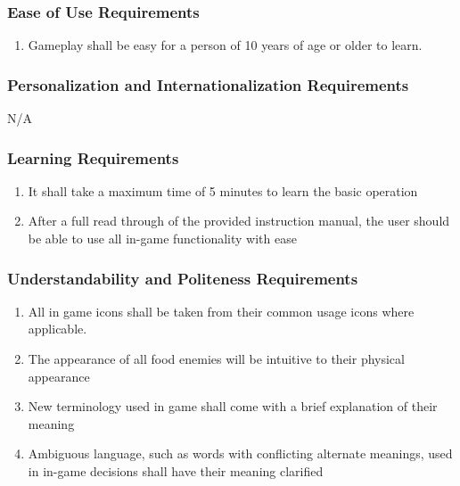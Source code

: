 \documentclass[12pt, titlepage]{article}
\begin{document}
\subsubsection{Ease of Use Requirements}
\label{ssub:ease_of_use_requirements}
\begin{enumerate}[start=1,label={ UH\arabic*.}]
        \item Gameplay shall be easy for a person of 10 years of age or older to learn.
\end{enumerate}

\subsubsection{Personalization and Internationalization Requirements}
\label{ssub:personalization_and_internationalization_requirements}
N/A

\subsubsection{Learning Requirements}
\label{ssub:learning_requirements}
\begin{enumerate}[start=2,label={ UH\arabic*.}]
        \item It shall take a maximum time of 5 minutes to learn the basic operation
        \item After a full read through of the provided instruction manual, the user should be able to use all in-game functionality with ease
\end{enumerate}

\subsubsection{Understandability and Politeness Requirements}
\label{ssub:understandability_and_politeness_requirements}
\begin{enumerate}[start=4,label={ UH\arabic*.}]
        \item All in game icons shall be taken from their common usage icons where applicable.
        \item The appearance of all food enemies will be intuitive to their physical appearance
        \item New terminology used in game shall come with a brief explanation of their meaning
        \item Ambiguous language, such as words with conflicting alternate meanings, used in in-game decisions shall have their meaning clarified

\end{enumerate}
\end{document}
